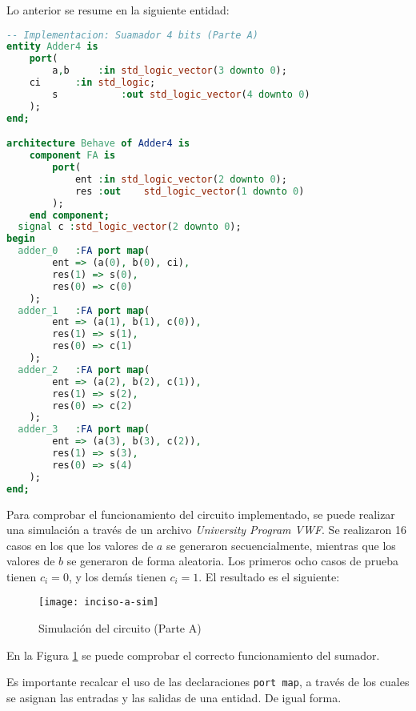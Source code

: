 \documentclass[../procedimientos.tex]{subfiles}
\begin{document}
Lo anterior se resume en la siguiente entidad:
\begin{lstlisting}[language=VHDL]
-- Implementacion: Suamador 4 bits (Parte A)
entity Adder4 is
	port(
		a,b		:in std_logic_vector(3 downto 0);
    ci		:in std_logic;
		s			:out std_logic_vector(4 downto 0)
	);
end;

architecture Behave of Adder4 is
	component FA is
		port(
			ent	:in	std_logic_vector(2 downto 0);
			res	:out	std_logic_vector(1 downto 0)
		);
	end component;
  signal c :std_logic_vector(2 downto 0);
begin
  adder_0	:FA port map(
		ent => (a(0), b(0), ci),
		res(1) => s(0),
		res(0) => c(0)
	);
  adder_1	:FA port map(
		ent => (a(1), b(1), c(0)),
		res(1) => s(1),
		res(0) => c(1)
	);
  adder_2	:FA port map(
		ent => (a(2), b(2), c(1)),
		res(1) => s(2),
		res(0) => c(2)
	);
  adder_3	:FA port map(
		ent => (a(3), b(3), c(2)),
		res(1) => s(3),
		res(0) => s(4)
	);
end;
\end{lstlisting}

Para comprobar el funcionamiento del circuito implementado, se puede realizar 
una simulación a través de un archivo \textit{University Program VWF}. Se 
realizaron 16 casos en los que los valores de $a$ se generaron 
secuencialmente, mientras que los valores de $b$ se generaron de forma 
aleatoria. Los primeros ocho casos de prueba tienen $c_i = 0$, y los demás 
tienen $c_i = 1$. El resultado es el siguiente:
\begin{figure}[H]
  \centering
  \texttt{[image: inciso-a-sim]}
  \caption{Simulación del circuito (Parte A)}
  \label{fig:inciso_a_sim}
\end{figure}

En la Figura \ref{fig:inciso_a_sim} se puede comprobar el correcto 
funcionamiento del sumador.

Es importante recalcar el uso de las declaraciones \texttt{port map}, a través 
de los cuales se asignan las entradas y las salidas de una entidad. De igual 
forma.
\end{document}

